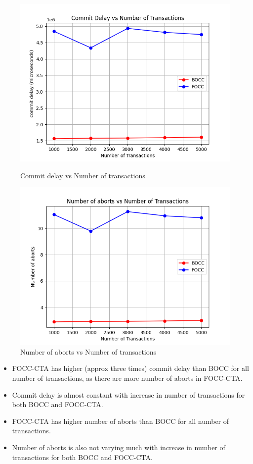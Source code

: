 \documentclass[12pt]{article}
\begin{document}
\begin{figure}[h]
    \centering
    \begin{minipage}[b]{0.45\textwidth}
        \includegraphics[width=\textwidth]{../code/commitDelayVsNumTrans.png}
        \caption{Commit delay vs Number of transactions}
    \end{minipage}
    \hfill
    \begin{minipage}[b]{0.45\textwidth}
        \includegraphics[width=\textwidth]{../code/numAbortsVsNumTrans.png}
        \caption{Number of aborts vs Number of transactions}
    \end{minipage}
\end{figure}
\begin{itemize}
    \item FOCC-CTA has higher (approx three times) commit delay than BOCC for all number of transactions, as there are more number of aborts in FOCC-CTA.
    \item Commit delay is almost constant with increase in number of transactions for both BOCC and FOCC-CTA.
    \item FOCC-CTA has higher number of aborts than BOCC for all number of transactions.
    \item Number of aborts is also not varying much with increase in number of transactions for both BOCC and FOCC-CTA.
\end{itemize}
\end{document}
